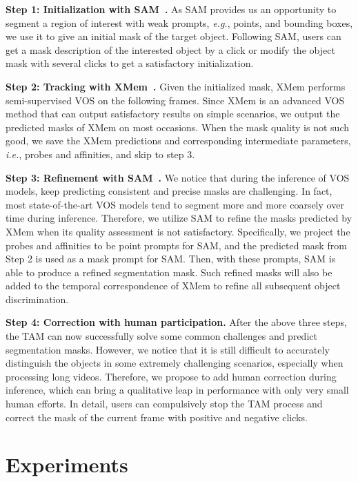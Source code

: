 \documentclass{article}
\begin{document}
\textbf{Step 1: Initialization with SAM~\cite{sam}.}
As SAM provides us an opportunity to segment a region of interest with weak prompts, \textit{e.g.}, points, and bounding boxes, we use it to give an initial mask of the target object.
Following SAM, users can get a mask description of the interested object by a click or modify the object mask with several clicks to get a satisfactory initialization.

\textbf{Step 2: Tracking with XMem~\cite{xmem}.}
Given the initialized mask, XMem performs semi-supervised VOS on the following frames.
Since XMem is an advanced VOS method that can output satisfactory results on simple scenarios, we output the predicted masks of XMem on most occasions.
When the mask quality is not such good, we save the XMem predictions and corresponding intermediate parameters, \textit{i.e.}, probes and affinities, and skip to step 3.


\textbf{Step 3: Refinement with SAM~\cite{sam}.}
We notice that during the inference of VOS models, keep predicting consistent and precise masks are challenging.
In fact, most state-of-the-art VOS models tend to segment more and more coarsely over time during inference.
Therefore, we utilize SAM to refine the masks predicted by XMem when its quality assessment is not satisfactory.
Specifically, we project the probes and affinities to be point prompts for SAM, and the predicted mask from Step 2 is used as a mask prompt for SAM.
Then, with these prompts, SAM is able to produce a refined segmentation mask.
Such refined masks will also be added to the temporal correspondence of XMem to refine all subsequent object discrimination.

\textbf{Step 4: Correction with human participation.}
After the above three steps, the TAM can now successfully solve some common challenges and predict segmentation masks.
However, we notice that it is still difficult to accurately distinguish the objects in some extremely challenging scenarios, especially when processing long videos.
Therefore, we propose to add human correction during inference, which can bring a qualitative leap in performance with only very small human efforts.
In detail, users can compulsively stop the TAM process and correct the mask of the current frame with positive and negative clicks.

\section{Experiments}
\end{document}
